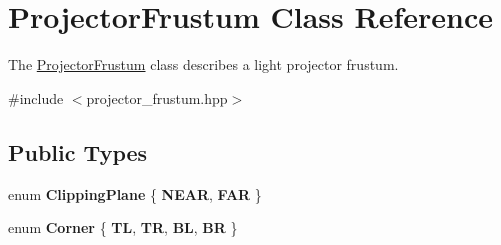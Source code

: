 \hypertarget{class_projector_frustum}{}\section{Projector\+Frustum Class Reference}
\label{class_projector_frustum}


The \mbox{\hyperlink{class_projector_frustum}{Projector\+Frustum}} class describes a light projector frustum.  




{\ttfamily \#include $<$projector\+\_\+frustum.\+hpp$>$}

\subsection*{Public Types}
\begin{DoxyCompactItemize}
\item 
\mbox{\label{class_projector_frustum_ada11c8a7dc78a009ac6a7fd8667c264b}} 
enum {\bfseries Clipping\+Plane} \{ {\bfseries N\+E\+AR}, 
{\bfseries F\+AR}
 \}
\item 
\mbox{\label{class_projector_frustum_a3ed65cdb2799b84b6d8341ee77e69c74}} 
enum {\bfseries Corner} \{ {\bfseries TL}, 
{\bfseries TR}, 
{\bfseries BL}, 
{\bfseries BR}
 \}
\end{DoxyCompactItemize}
